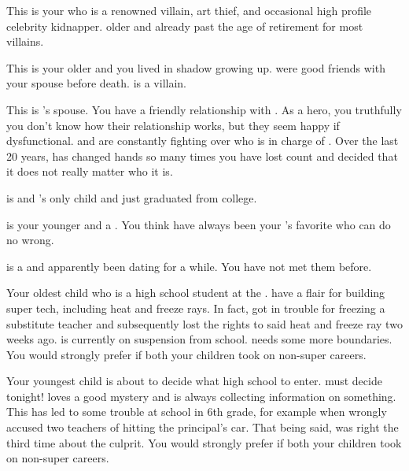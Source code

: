 \documentclass[char]{LRSguildcamp1}
\begin{document}
\begin{contacts}
	\contact{\cGrandma{}} This is your \cGrandma{\parent} who is a renowned villain, art thief, and occasional high profile celebrity kidnapper. \cGrandma{\Theyare} older and already past the age of retirement for most villains.
	
	\contact{\cOldest{}} This is your older \cOldest{\sibling} and you lived in \cOldest{\their} shadow growing up. \cOldest{\They} were good friends with your spouse before \cAS{\their} death. \cOldest{} is a villain. 
	
	\contact{\cOS{}} This is \cOldest{}'s spouse. You have a friendly relationship with \cOS{\them}. As a hero, you truthfully you don't know how their relationship works, but they seem happy if dysfunctional.  \cOldest{} and \cOS{} are constantly fighting over who is in charge of \pCityO{}.  Over the last 20 years, \pCityO{} has changed hands so many times you have lost count and decided that it does not really matter who it is. 
	
	\contact{\cGrad{}} \cGrad{} is \cOldest{} and \cOS{}'s only child and just graduated from college. 
	
	\contact{\cYoungest{}} \cYoungest{} is your younger \cYoungest{\sibling} and a \cYoungest{\hero}. You think  have always been your \cGrandma{\parent}'s favorite who can do no wrong. 
	
	\contact{\cYS{}} \cYS{} is a \cYS{\hero} and apparently been dating \cYoungest{} for a while. You have not met them before. 
	
	\contact{\cTeen{}} Your oldest child who is a high school student at the \pNormalSchool{}. \cTeen{\They} have a flair for building super tech, including heat and freeze rays. In fact, \cTeen{} got in trouble for freezing a substitute teacher and subsequently lost the rights to said heat and freeze ray two weeks ago. \cTeen{} is currently on suspension from school. \cTeen{} needs some more boundaries. You would strongly prefer if both your children took on non-super careers.
	
	\contact{\cTween{}} Your youngest child is about to decide what high school to enter. \cTween{} must decide tonight! \cTween{} loves a good mystery and is always collecting information on something. This has led to some trouble at school in 6th grade, for example when \cTween{\they} wrongly accused two teachers of hitting the principal's car. That being said, \cTween{\they} was right the third time about the culprit. You would strongly prefer if both your children took on non-super careers.
\end{contacts}
\end{document}
